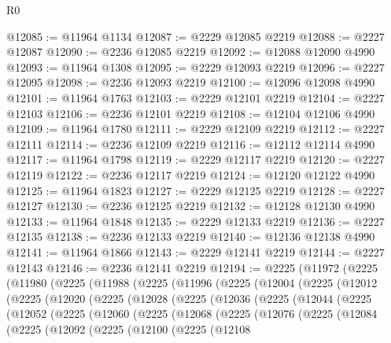 \begin{lexlean}{R0}
\begin{coremodule}
@12085 := @11964 @1134
@12087 := @2229 @12085 @2219
@12088 := @2227 @12087
@12090 := @2236 @12085 @2219
@12092 := @12088 @12090 @4990
@12093 := @11964 @1308
@12095 := @2229 @12093 @2219
@12096 := @2227 @12095
@12098 := @2236 @12093 @2219
@12100 := @12096 @12098 @4990
@12101 := @11964 @1763
@12103 := @2229 @12101 @2219
@12104 := @2227 @12103
@12106 := @2236 @12101 @2219
@12108 := @12104 @12106 @4990
@12109 := @11964 @1780
@12111 := @2229 @12109 @2219
@12112 := @2227 @12111
@12114 := @2236 @12109 @2219
@12116 := @12112 @12114 @4990
@12117 := @11964 @1798
@12119 := @2229 @12117 @2219
@12120 := @2227 @12119
@12122 := @2236 @12117 @2219
@12124 := @12120 @12122 @4990
@12125 := @11964 @1823
@12127 := @2229 @12125 @2219
@12128 := @2227 @12127
@12130 := @2236 @12125 @2219
@12132 := @12128 @12130 @4990
@12133 := @11964 @1848
@12135 := @2229 @12133 @2219
@12136 := @2227 @12135
@12138 := @2236 @12133 @2219
@12140 := @12136 @12138 @4990
@12141 := @11964 @1866
@12143 := @2229 @12141 @2219
@12144 := @2227 @12143
@12146 := @2236 @12141 @2219
@12194 := @2225
    (@11972
      (@2225
        (@11980
          (@2225
            (@11988
              (@2225
                (@11996
                  (@2225
                    (@12004
                      (@2225
                        (@12012
                          (@2225
                            (@12020
                              (@2225
                                (@12028
                                  (@2225
                                    (@12036
                                      (@2225
                                        (@12044
                                          (@2225
                                            (@12052
                                              (@2225
                                                (@12060
                                                  (@2225
                                                    (@12068
                                                      (@2225
                                                        (@12076
                                                          (@2225
                                                            (@12084
                                                              (@2225
                                                                (@12092
                                                                  (@2225
                                                                    (@12100
                                                                      (@2225
                                                                        (@12108

\end{coremodule}
\end{lexlean}
